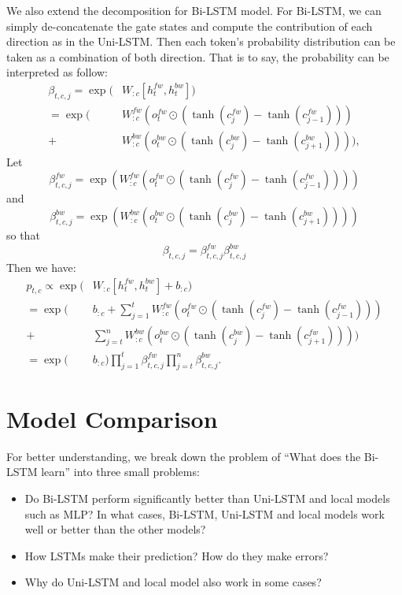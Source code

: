 \documentclass{article}
\begin{document}
We also extend the decomposition for Bi-LSTM model. For Bi-LSTM, we can simply de-concatenate the gate states and compute the contribution of each direction as in the Uni-LSTM. Then each token's probability distribution can be taken as a combination of both direction. That is to say, the probability can be interpreted as follow:
\begin{align}\label{eq:bi-beta} 
\beta_{t, c, j} = \exp(&W_{:c} [h_t^{fw}, h_t^{bw}])\\
= \exp(&W_{:c}^{fw} (o_t^{fw} \odot (\tanh(c_j^{fw})- \tanh(c_{j-1}^{fw}))) \\
+ &W_{:c}^{bw} (o_t^{bw} \odot (\tanh(c_j^{bw})- \tanh(c_{j+1}^{bw})))),
\end{align}
Let
\begin{equation}
\beta_{t, c, j}^{fw} = \exp(W_{:c}^{fw} (o_t^{fw} \odot (\tanh(c_j^{fw})- \tanh(c_{j-1}^{fw}))))
\end{equation}
and
\begin{equation}
\beta_{t, c, j}^{bw} = \exp(W_{:c}^{bw} (o_t^{bw} \odot (\tanh(c_j^{bw})- \tanh(c_{j+1}^{bw}))))
\end{equation}
so that 
\begin{equation}
\beta_{t, c, j} = \beta_{t, c, j}^{fw} \beta_{t, c, j}^{bw}
\end{equation}
Then we have:
\begin{align}
p_{t, c} \propto \exp(&W_{:c} [h_t^{fw}, h_t^{bw}] + b_{:c}) \\
= \exp(&b_{:c} + \sum_{j=1}^t W_{:c}^{fw} (o_t^{fw} \odot (\tanh(c_j^{fw}) - \tanh(c_{j-1}^{fw})))\\
	+&\sum_{j=t}^n W_{:c}^{bw} (o_t^{bw} \odot (\tanh(c_j^{bw}) - \tanh(c_{j+1}^{fw}))))\\
=  \exp(&b_{:c})\prod_{j=1}^t \beta_{t, c, j}^{fw} \prod_{j=t}^n \beta_{t, c, j}^{bw}.
\end{align}

\section{Model Comparison} \label{sec:question}

For better understanding, we break down the problem of ``What does the Bi-LSTM learn'' into three small problems:

\begin{itemize}
	\item Do Bi-LSTM perform significantly better than Uni-LSTM and local models such as MLP? 
	In what cases, Bi-LSTM, Uni-LSTM and local models work well or better than the other models?
	\item How LSTMs make their prediction? How do they make errors? %
	\item Why do Uni-LSTM and local model also work in some cases? 
\end{itemize}
\end{document}
